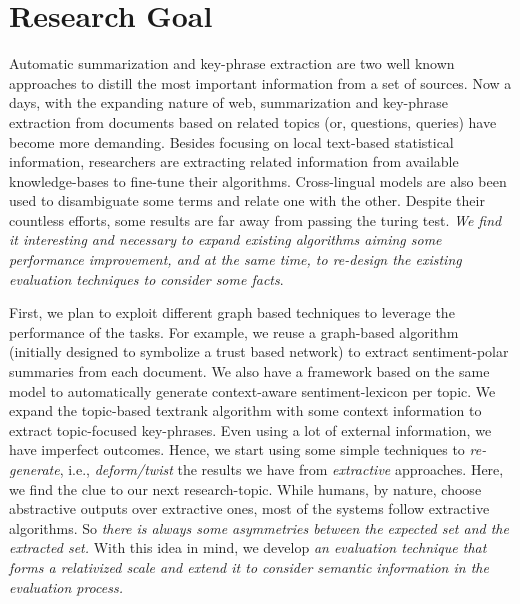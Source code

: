 \documentclass[a4paper]{report}
\begin{document}
\section*{Research Goal}
Automatic summarization and key-phrase extraction are two well known approaches to distill the most important information from a set of sources. Now a days, with the expanding nature of web, summarization and key-phrase extraction from documents based on related topics (or, questions, queries) have become more demanding. Besides focusing on local text-based statistical information, researchers are extracting related information from available knowledge-bases to fine-tune their algorithms. Cross-lingual models are also been used to disambiguate some terms and relate one with the other. Despite their countless efforts, some results are far away from passing the turing test. \emph{We find it interesting and necessary to expand existing algorithms aiming some performance improvement, and at the same time, to re-design the existing evaluation techniques to consider some facts}.\\

\par First, we plan to exploit different graph based techniques to leverage the performance of the tasks. For example, we reuse a graph-based algorithm (initially designed to symbolize a trust based network) to extract sentiment-polar summaries from each document. We also have a framework based on the same model to automatically generate context-aware sentiment-lexicon per topic. We expand the topic-based textrank algorithm with some context information to extract topic-focused key-phrases. Even using a lot of external information, we have imperfect outcomes. Hence, we start using some simple techniques to \emph{re-generate}, i.e., \emph{deform/twist} the results we have from \emph{extractive} approaches. Here, we find the clue to our next research-topic. While humans, by nature, choose abstractive outputs over extractive ones, most of the systems follow extractive algorithms. So \emph{there is always some asymmetries between the expected set and the extracted set.} With this idea in mind, we develop \emph{an evaluation technique that forms a relativized scale and extend it to consider semantic information in the evaluation process.}\\
\end{document}
